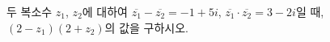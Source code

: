 두 복소수 $z_1$, $z_2$에 대하여 $\overline{z_1}-\overline{z_2}=-1+5i$, $\overline{z_1}\cdot\overline{z_2}=3-2i$일 때, $(2-z_1)(2+z_2)$의 값을 구하시오. 
